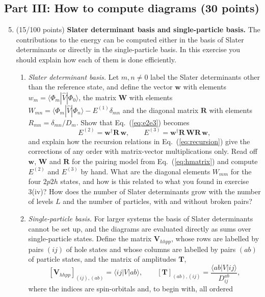 \documentclass[prc]{revtex4}
\begin{document}
\subsection*{Part III: How to compute diagrams (30 points)}

\begin{enumerate}
\setcounter{enumi}{4}

\item (15/100 points) \textbf{Slater determinant basis and single-particle basis.}
The contributions to the energy can be computed either in the basis of
Slater determinants or directly in the single-particle basis. In
this exercise you should explain how each of them is done efficiently.
\begin{enumerate}
\item \emph{Slater determinant basis.} Let $m,n\neq 0$ label the
  Slater determinants other than the reference state, and define the
  vector $\bm{w}$ with elements
  $w_m=\langle\Phi_m|\hat{V}|\Phi_0\rangle$, the matrix $\bm{W}$ with
  elements
  $W_{mn}=\langle\Phi_m|\hat{V}|\Phi_n\rangle-E^{(1)}\delta_{mn}$ and
  the diagonal matrix $\bm{R}$ with elements
  $R_{mn}=\delta_{mn}/D_m$. Show that Eq.~(\ref{eq:e2e3}) becomes
\[
E^{(2)}=\bm{w}^\dagger\bm{R}\,\bm{w},\qquad
E^{(3)}=\bm{w}^\dagger\bm{R}\,\bm{W}\bm{R}\,\bm{w},
\]
  and explain how the recursion relations in
  Eq.~(\ref{eq:recursion}) give the corrections of any order with
  matrix-vector multiplications only. Read off $\bm{w}$, $\bm{W}$ and
  $\bm{R}$ for the pairing model from Eq.~(\ref{eq:hmatrix}) and compute
  $E^{(2)}$ and $E^{(3)}$ by hand. What are the diagonal elements
  $W_{mm}$ for the four $2p2h$ states, and how is this related to
  what you found in exercise 3(iv)? How does the number of Slater
  determinants grow with the number of levels $L$ and the number of
  particles, with and without broken pairs?
\item \emph{Single-particle basis.} For larger systems the basis of
  Slater determinants cannot be set up, and the diagrams are evaluated
  directly as sums over single-particle states. Define the matrix
  $\bm{V}_{hhpp}$, whose rows are labelled by pairs $(ij)$ of hole
  states and whose columns are labelled by pairs $(ab)$ of particle
  states, and the matrix of amplitudes $\bm{T}$,
\[
\left[\bm{V}_{hhpp}\right]_{(ij),(ab)}=\langle ij|V|ab\rangle,\qquad
\left[\bm{T}\right]_{(ab),(ij)}
=\frac{\langle ab|V|ij\rangle}{D_{ij}^{ab}} ,
\]
  where the indices are spin-orbitals and, to begin with, all ordered

\end{enumerate}
\end{enumerate}
\end{document}
